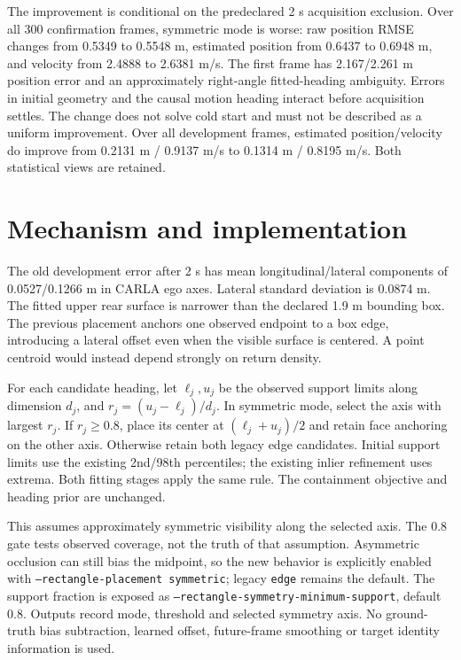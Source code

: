 \documentclass[11pt]{article}
\begin{document}
The improvement is conditional on the predeclared 2 s acquisition exclusion.
Over all 300 confirmation frames, symmetric mode is worse: raw position
RMSE changes from 0.5349 to 0.5548 m, estimated position from 0.6437 to
0.6948 m, and velocity from 2.4888 to 2.6381 m/s. The first frame has
2.167/2.261 m position error and an approximately right-angle fitted-heading
ambiguity. Errors in initial geometry and the causal motion heading interact
before acquisition settles. The change does not solve cold start and must not
be described as a uniform improvement. Over all development frames, estimated
position/velocity do improve from 0.2131 m / 0.9137 m/s to
0.1314 m / 0.8195 m/s. Both statistical views are retained.


\section{Mechanism and implementation}
The old development error after 2 s has mean longitudinal/lateral components
of 0.0527/0.1266 m in CARLA ego axes. Lateral standard deviation is 0.0874 m.
The fitted upper rear surface is narrower than the declared 1.9 m bounding
box. The previous placement anchors one observed endpoint to a box edge,
introducing a lateral offset even when the visible surface is centered.
A point centroid would instead depend strongly on return density.

For each candidate heading, let $\ell_j,u_j$ be the observed support limits
along dimension $d_j$, and $r_j=(u_j-\ell_j)/d_j$. In symmetric mode, select
the axis with largest $r_j$. If $r_j\ge0.8$, place its center at
$(\ell_j+u_j)/2$ and retain face anchoring on the other axis. Otherwise retain
both legacy edge candidates. Initial support limits use the existing 2nd/98th
percentiles; the existing inlier refinement uses extrema. Both fitting stages
apply the same rule. The containment objective and heading prior are unchanged.

This assumes approximately symmetric visibility along the selected axis.
The 0.8 gate tests observed coverage, not the truth of that assumption.
Asymmetric occlusion can still bias the midpoint, so the new behavior is
explicitly enabled with \texttt{--rectangle-placement symmetric}; legacy
\texttt{edge} remains the default. The support fraction is exposed as
\texttt{--rectangle-symmetry-minimum-support}, default 0.8. Outputs record
mode, threshold and selected symmetry axis. No ground-truth bias subtraction,
learned offset, future-frame smoothing or target identity information is used.
\end{document}
